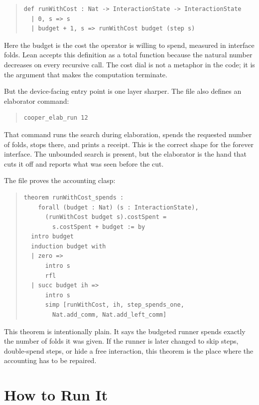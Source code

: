 \begin{quote}\small
\begin{verbatim}
def runWithCost : Nat -> InteractionState -> InteractionState
  | 0, s => s
  | budget + 1, s => runWithCost budget (step s)
\end{verbatim}
\end{quote}

Here the budget is the cost the operator is willing to spend, measured in interface folds. Lean accepts this
definition as a total function because the natural number decreases on every recursive call. The cost dial is not
a metaphor in the code; it is the argument that makes the computation terminate.

But the device-facing entry point is one layer sharper. The file also defines an elaborator command:

\begin{quote}\small
\begin{verbatim}
cooper_elab_run 12
\end{verbatim}
\end{quote}

That command runs the search during elaboration, spends the requested number of folds, stops there, and prints a
receipt. This is the correct shape for the forever interface. The unbounded search is present, but the elaborator
is the hand that cuts it off and reports what was seen before the cut.

The file proves the accounting clasp:

\begin{quote}\small
\begin{verbatim}
theorem runWithCost_spends :
    forall (budget : Nat) (s : InteractionState),
      (runWithCost budget s).costSpent =
        s.costSpent + budget := by
  intro budget
  induction budget with
  | zero =>
      intro s
      rfl
  | succ budget ih =>
      intro s
      simp [runWithCost, ih, step_spends_one,
        Nat.add_comm, Nat.add_left_comm]
\end{verbatim}
\end{quote}

This theorem is intentionally plain. It says the budgeted runner spends exactly the number of folds it was given.
If the runner is later changed to skip steps, double-spend steps, or hide a free interaction, this theorem is the
place where the accounting has to be repaired.

\section{How to Run It}

